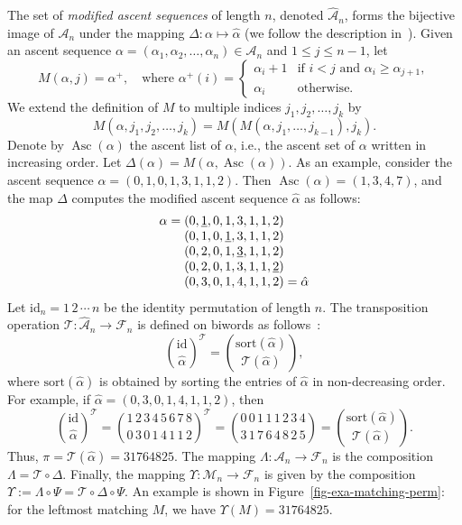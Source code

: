\documentclass[11pt]{article}
\newcommand{\A}{\mathcal{A}}
\newcommand{\F}{\mathcal{F}}
\newcommand{\M}{\mathcal{M}}
\newcommand{\T}{\mathcal{T}}
\begin{document}
	The set of \emph{modified ascent sequences}
	of length $n$, denoted \( \mathcal{\hat{A}}_n \), forms the bijective image of \( \mathcal{A}_n \) under the mapping \( \Delta : \alpha \mapsto \hat{\alpha} \) (we follow the description in~\cite{Cerbai-Claesson}).
	Given an ascent sequence \( \alpha = (\alpha_1, \alpha_2, \ldots, \alpha_n) \in \mathcal{A}_n \) and $1\leq j\leq n-1$, let
	\[
	M(\alpha, j) = \alpha^+, \quad \text{where } \alpha^+(i) = 
	\begin{cases} 
		\alpha_i + 1 & \text{if } i < j \text{ and } \alpha_i \geq \alpha_{j+1}, \\
		\alpha_i & \text{otherwise}.
	\end{cases}
	\]
	We extend the definition of \( M \) to multiple indices \( j_1, j_2, \ldots, j_k \) by
	\[
	M(\alpha, j_1, j_2, \ldots, j_k) = M\left(M(\alpha, j_1, \ldots, j_{k-1}), j_k\right).
	\]
	Denote by \( \operatorname{Asc}(\alpha) \)  the ascent list of \( \alpha \), i.e., the ascent set of $\alpha$ written in increasing order. Let \( \Delta(\alpha) = M(\alpha, \operatorname{Asc}(\alpha)) \). As an example, consider the ascent sequence \( \alpha = (0, 1, 0, 1, 3, 1, 1, 2) \). Then \( \operatorname{Asc}(\alpha) = (1, 3, 4, 7) \), and the map \( \Delta \) computes the modified ascent sequence \( \hat{\alpha} \) as follows:
	\[
	\begin{array}{r@{\;}l}
		\alpha =&(0,\underline{1},0,1,3,1,1,2)  \\
		&(0,1,0,\underline{1},3,1,1,2)\\
		&(0,2,0,1,\underline{3},1,1,2) \\
		&(0,2,0,1,3,1,1,\underline{2}) \\
		&(0,3,0,1,4,1,1,2) = \hat{\alpha} \\
	\end{array}
	\]
	Let $\mathrm{id}_n = 1\,2\,\cdots\,n$ be the identity permutation of length $n$.  
	The transposition operation \( \mathcal{T} : \hat{\mathcal{A}}_n \to \mathcal{F}_n \) is defined on biwords as follows~\cite{Cerbai-Claesson}:
	\[
	{\binom{\mathrm{id}}{\hat{\alpha}}}^{\mathcal{T}} = \binom{\mathrm{sort}(\hat{\alpha})}{\mathcal{T}(\hat{\alpha})},
	\]
	where $\mathrm{sort}(\hat{\alpha})$ is obtained by sorting the entries of $\hat{\alpha}$ in non-decreasing order.
	For example, if $\hat{\alpha}= (0,3,0,1,4,1,1,2)$, then
	\[
	{\binom{\text{id}}{\hat{\alpha}}}^{\T} = {\binom{1\,2\,3\,4\,5\,6\,7\,8}{0\,3\,0\,1\,4\,1\,1\,2}}^{\T} = \binom{0\,0\,1\,1\,1\,2\,3\,4}{3\,1\,7\,6\,4\,8\,2\,5} = \binom{\text{sort}(\hat{\alpha})}{\T(\hat{\alpha})}.
	\]
	Thus, $\pi = \T(\hat{\alpha})= 31764825$.
	The mapping $\Lambda: \A_n \to \F_n$ is the composition $\Lambda = \T \circ \Delta$. Finally, the mapping $\Upsilon: \M_n \to \F_n$ is given by the composition $\Upsilon := \Lambda \circ \Psi = \T \circ \Delta \circ \Psi$. 
	An example is shown in Figure~\ref{fig-exa-matching-perm}: for the leftmost matching $M$, we have $\Upsilon(M)= 31764825$.
	
\end{document}
